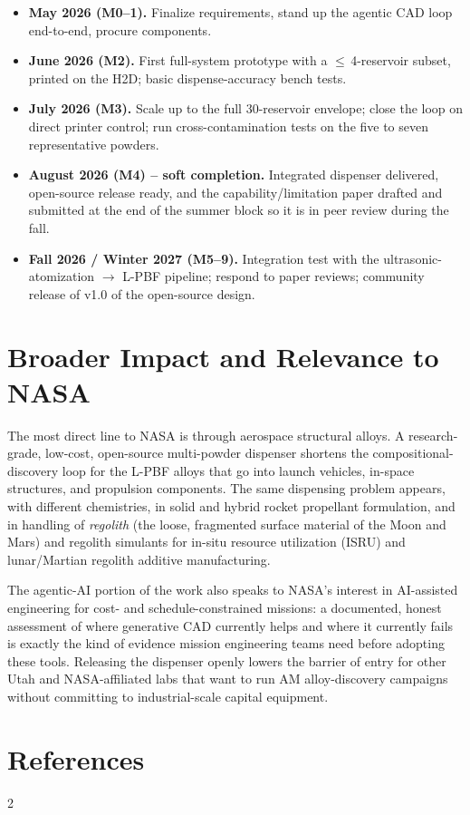 \documentclass[11pt]{article}
\begin{document}
\begin{itemize}[leftmargin=1.5em,itemsep=0.1em,topsep=0.1em]
  \item \textbf{May 2026 (M0--1).} Finalize requirements, stand up the
        agentic CAD loop end-to-end, procure components.
  \item \textbf{June 2026 (M2).} First full-system prototype with a
        $\le\,$4-reservoir subset, printed on the H2D; basic
        dispense-accuracy bench tests.
  \item \textbf{July 2026 (M3).} Scale up to the full 30-reservoir
        envelope; close the loop on direct printer control; run
        cross-contamination tests on the five to seven representative
        powders.
  \item \textbf{August 2026 (M4) -- soft completion.} Integrated
        dispenser delivered, open-source release ready, and the
        capability/limitation paper drafted and submitted at the end
        of the summer block so it is in peer review during the fall.
  \item \textbf{Fall 2026 / Winter 2027 (M5--9).} Integration test
        with the ultrasonic-atomization $\rightarrow$ L-PBF pipeline;
        respond to paper reviews; community release of v1.0 of the
        open-source design.
\end{itemize}

\section{Broader Impact and Relevance to NASA}

The most direct line to NASA is through aerospace structural alloys.
A research-grade, low-cost, open-source multi-powder dispenser
shortens the compositional-discovery loop for the L-PBF alloys that go
into launch vehicles, in-space structures, and propulsion components.
The same dispensing problem appears, with different chemistries, in
solid and hybrid rocket propellant formulation, and in handling of
\emph{regolith} (the loose, fragmented surface material of the Moon
and Mars) and regolith simulants for in-situ resource utilization
(ISRU) and lunar/Martian regolith additive manufacturing.

The agentic-AI portion of the work also speaks to NASA's interest in
AI-assisted engineering for cost- and schedule-constrained missions:
a documented, honest assessment of where generative CAD currently
helps and where it currently fails is exactly the kind of evidence
mission engineering teams need before adopting these tools.  Releasing
the dispenser openly lowers the barrier of entry for other Utah and
NASA-affiliated labs that want to run AM alloy-discovery campaigns
without committing to industrial-scale capital equipment.

\section*{References}
\vspace{-0.6\baselineskip}
\renewcommand{\bibsection}{}
\setlength{\bibsep}{1.5pt plus 1pt}

\begin{multicols}{2}
{\scriptsize}
\end{multicols}
\end{document}
